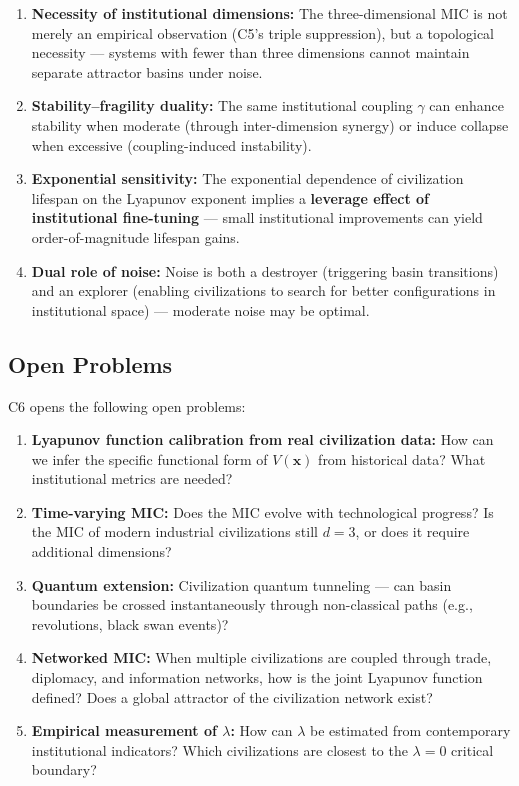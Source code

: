 \documentclass[12pt,a4paper]{article}
\theoremstyle{definition}
\newcommand{\lb}{\lambda}
\newcommand{\Lyap}{V}
\begin{document}
\begin{enumerate}[label=(\arabic*), leftmargin=*]
    \item \textbf{Necessity of institutional dimensions:} The three-dimensional MIC is not merely an empirical observation (C5's triple suppression), but a topological necessity --- systems with fewer than three dimensions cannot maintain separate attractor basins under noise.
    \item \textbf{Stability--fragility duality:} The same institutional coupling $\gamma$ can enhance stability when moderate (through inter-dimension synergy) or induce collapse when excessive (coupling-induced instability).
    \item \textbf{Exponential sensitivity:} The exponential dependence of civilization lifespan on the Lyapunov exponent implies a \textbf{leverage effect of institutional fine-tuning} --- small institutional improvements can yield order-of-magnitude lifespan gains.
    \item \textbf{Dual role of noise:} Noise is both a destroyer (triggering basin transitions) and an explorer (enabling civilizations to search for better configurations in institutional space) --- moderate noise may be optimal.
\end{enumerate}

\subsection{Open Problems}
\label{sec:open}

\noindent
C6 opens the following open problems:

\begin{enumerate}[label=\textbf{OP\arabic*}, leftmargin=*]
    \item \textbf{Lyapunov function calibration from real civilization data:} How can we infer the specific functional form of $\Lyap(\mathbf{x})$ from historical data? What institutional metrics are needed?
    \item \textbf{Time-varying MIC:} Does the MIC evolve with technological progress? Is the MIC of modern industrial civilizations still $d=3$, or does it require additional dimensions?
    \item \textbf{Quantum extension:} Civilization quantum tunneling --- can basin boundaries be crossed instantaneously through non-classical paths (e.g., revolutions, black swan events)?
    \item \textbf{Networked MIC:} When multiple civilizations are coupled through trade, diplomacy, and information networks, how is the joint Lyapunov function defined? Does a global attractor of the civilization network exist?
    \item \textbf{Empirical measurement of $\lb$:} How can $\lb$ be estimated from contemporary institutional indicators? Which civilizations are closest to the $\lb=0$ critical boundary?
\end{enumerate}
\end{document}
